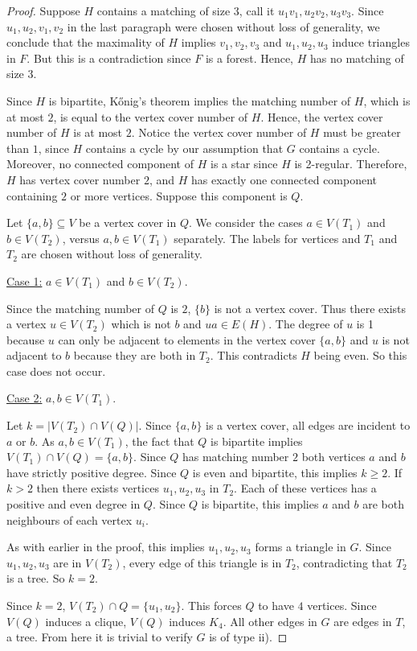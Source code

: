 \documentclass[11pt]{amsart}
\theoremstyle{definition}
\begin{document}
\begin{proof}
Suppose $H$ contains a matching of size $3$, call it $u_1v_1,u_2v_2,u_3v_3$.
Since $u_1,u_2,v_1,v_2$ in the last paragraph were chosen without loss of generality, we conclude that the maximality of $H$ implies $v_1,v_2,v_3$ and $u_1,u_2,u_3$ induce triangles in $F$.
But this is a contradiction since $F$ is a forest.
Hence, $H$ has no matching of size $3$.


Since $H$ is bipartite, K\H{o}nig's theorem implies the matching number of $H$, which is at most $2$, 
is equal to the vertex cover number of $H$.
Hence, the vertex cover number of $H$ is at most $2$.
Notice the vertex cover number
of $H$ must be greater than $1$, since $H$ contains a cycle by our assumption that $G$ contains a cycle.
Moreover, no connected component of $H$ is a star since $H$ is 2-regular. 
Therefore, $H$ has vertex cover number $2$, and $H$ has exactly one connected component containing $2$ or more vertices.
Suppose this component is $Q$.


Let $\{a,b\}\subseteq V$ be a vertex cover in $Q$.
We consider the cases 
$a \in V(T_1)$ and $b\in V(T_2)$, versus $a,b\in V(T_1)$ separately.
The labels for vertices and $T_1$ and $T_2$ are chosen without loss of generality.


\medskip
\noindent \underline{Case 1:} $a \in V(T_1)$ and $b\in V(T_2)$.
\medskip

Since the matching number of $Q$ is $2$, $\{b\}$ is not a vertex cover.
Thus there exists a vertex $u\in V(T_2)$ which is not $b$ and $ua\in E(H)$. The degree of $u$ is 1 because $u$ can only be adjacent to elements in the vertex cover $\{a,b\}$ and $u$ is not adjacent to $b$ because they are both in $T_2$.
This contradicts $H$ being even. So this case does not occur.

\medskip
\noindent \underline{Case 2:} $a,b \in V(T_1)$.
\medskip

Let $k = |V(T_2)\cap V(Q)|$.
Since $\{a,b\}$ is a vertex cover, all edges are incident to $a$ or $b$.
As $a,b \in V(T_1)$, the fact that $Q$ is bipartite implies $V(T_1)\cap V(Q) = \{a,b\}$.
Since $Q$ has matching number $2$
both vertices $a$ and $b$ have strictly positive degree.
Since $Q$ is even and bipartite, this implies $k\geq 2$.
If $k>2$ then there exists vertices $u_1,u_2,u_3$ in $T_2$.
Each of these vertices has a positive and even degree in $Q$.
Since $Q$ is bipartite, this implies $a$ and $b$ are both neighbours of each vertex $u_i$.

As with earlier in the proof, this implies $u_1,u_2,u_3$ forms a triangle in $G$.
Since $u_1,u_2,u_3$ are in $V(T_2)$, every edge of this triangle is in $T_2$, contradicting that $T_2$ is a tree.
So $k=2$.

Since $k=2$, $V(T_2)\cap Q = \{u_1,u_2\}$.
This forces $Q$ to have $4$ vertices.
Since $V(Q)$ induces a clique, $V(Q)$ induces $K_4$.
All other edges in $G$ are edges in $T$, a tree.
From here it is trivial to verify $G$ is of type ii).
\end{proof}
\end{document}
